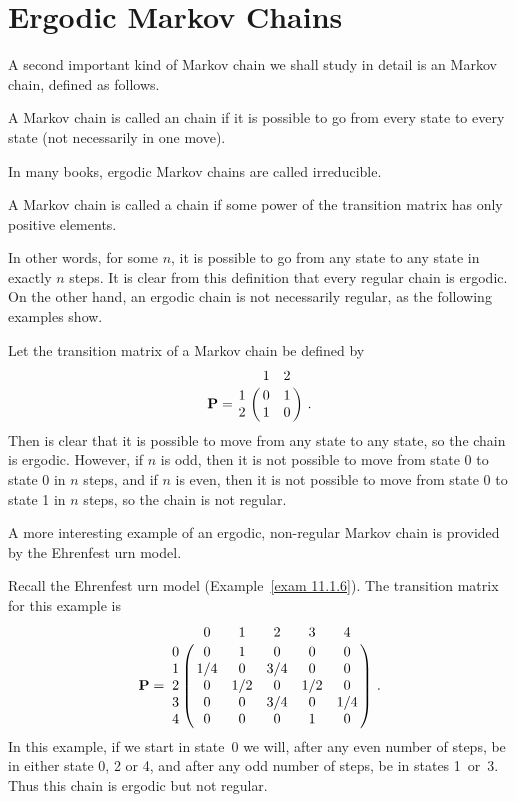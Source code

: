 \section{Ergodic Markov Chains}\label{sec 11.3} 
 
A second important kind of Markov chain we shall study in detail is an
 Markov
chain, defined as follows.

\begin{definition}\label{defn 11.3.6.5}
A Markov chain is called an  chain if it is possible to go from 
every state to every state (not necessarily in one move).
\end{definition}
\par
In many books, ergodic Markov chains are called \emx
{irreducible}.

\begin{definition}\label{defn 11.3.7}
A Markov chain is called a  chain if some power of the
transition matrix has only positive elements.
\end{definition}
\par
In other words, for some $n$, it is possible to go from any state to any state
in exactly $n$ steps.  It is clear from this definition that every regular 
chain is ergodic.  On the other hand, an ergodic chain is not necessarily 
regular, as the following examples show.

\begin{example}
Let the transition matrix of a Markov chain be defined by
$$\mat{P} = \bordermatrix{
   &  1  &  2  \cr
1  &  0  &  1  \cr
2  &  1  &  0}\ .
$$
Then is clear that it is possible to move from any state to any state, so the
chain is ergodic.  However, if $n$ is odd, then it is not possible to move from 
state 0 to state 0 in $n$ steps, and if $n$ is even, then it is not possible to
move from state 0 to state 1 in $n$ steps, so the chain is not regular.
\end{example}
A more interesting example of an ergodic, non-regular Markov chain is provided
by the Ehrenfest urn model.

\begin{example}
Recall the Ehrenfest urn model (Example~\ref{exam 11.1.6}).
The transition matrix for this example is
$$
\mat{P} = \bordermatrix{
  &  0  &  1  &  2  &  3  &  4  \cr
0 &  0  &  1  &  0  &  0  &  0  \cr
1 & 1/4 &  0  & 3/4 &  0  &  0  \cr
2 &  0  & 1/2 &  0  & 1/2 &  0  \cr
3 &  0  &  0  & 3/4 &  0  & 1/4 \cr
4 &  0  &  0  &  0  &  1  &  0}\ .
$$
In this example, if we start in state~0 we will, after any even number of
steps, be in either state 0, 2 or 4, and after any odd number of steps, 
be in states 1~or~3.  Thus this chain is ergodic but not regular.
\end{example}

